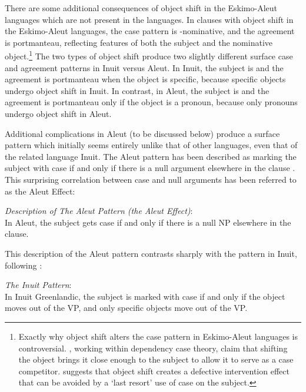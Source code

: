 \documentclass[output=paper]{LSP/langsci}
\begin{document}
There are some additional consequences of object shift in the Eskimo-Aleut languages which are not present in the  languages. In clauses with object shift in the Eskimo-Aleut languages, the case pattern is -nominative, and the agreement is portmanteau, reflecting features of both the  subject and the nominative object.\footnote{Exactly why object shift alters the case pattern in Eskimo-Aleut languages is controversial. \citet{bittner1996ergativity}, working within dependency case theory, claim that shifting the object brings it close enough to the subject to allow it to serve as a case competitor. \citet{woolford2015ergativity} suggests that object shift creates a defective intervention effect that can be avoided by a ‘last resort’ use of  case on the subject. } The two types of object shift produce two slightly different surface case and agreement patterns in Inuit versus Aleut. In Inuit, the subject is  and the agreement is portmanteau when the object is specific, because specific objects undergo object shift in Inuit. In contrast, in Aleut, the subject is  and the agreement is portmanteau only if the object is a pronoun, because only pronouns undergo object shift in Aleut. 

Additional complications in Aleut (to be discussed below) produce a surface  pattern which initially seems entirely unlike that of other  languages, even that of the related language Inuit. The Aleut pattern has been described as marking the subject with  case if and only if there is a null argument elsewhere in the clause \citep{bergsland1997aleut,boyle2000aleut,sadock2000aleut,Sadock2009}. This surprising correlation between  case and null arguments has been referred to as the Aleut Effect:


\ea\label{ex:woolford:4}
\textit{Description of The Aleut  Pattern (the Aleut Effect)}:\\
In Aleut, the subject gets  case if and only if there is a null NP elsewhere in the clause.
\z

\noindent This description of the Aleut pattern contrasts sharply with the  pattern in Inuit, following \citet{bittner1996ergativity}:

\ea\label{ex:woolford:5}
\textit{The Inuit  Pattern}:\\

In Inuit Greenlandic, the subject is marked with  case if and only if the object moves out of the VP, and only specific objects move out of the VP.
\z
\end{document}
